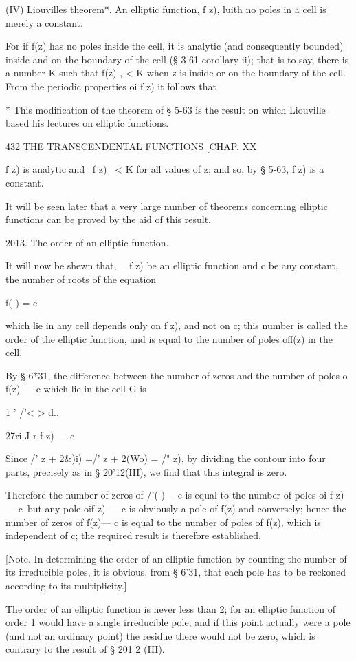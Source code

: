 (IV) Liouvilles theorem*. An elliptic function, f z), luith no poles
in a cell is merely a constant.

For if f(z) has no poles inside the cell, it is analytic (and
consequently bounded) inside and on the boundary of the cell (§ 3-61
corollary ii); that is to say, there is a number K such that f(z) , <
K when z is inside or on the boundary of the cell. From the periodic
properties oi f z) it follows that

* This modification of the theorem of § 5-63 is the result on which
Liouville based his lectures on elliptic functions.

432 THE TRANSCENDENTAL FUNCTIONS [CHAP. XX

f z) is analytic and \ f z) \ < K for all values of z; and so, by §
5-63, f z) is a constant.

It will be seen later that a very large number of theorems concerning
elliptic functions can be proved by the aid of this result.

2013. The order of an elliptic function.

It will now be shewn that, \ \ f z) be an elliptic function and c be
any constant, the number of roots of the equation

f( ) = c

which lie in any cell depends only on f z), and not on c; this number
is called the order of the elliptic function, and is equal to the
number of poles off(z) in the cell.

By § 6*31, the difference between the number of zeros and the number
of poles o f(z) — c which lie in the cell G is

1 ' /'< > d..

27ri J r f z) — c

Since /' z + 2\&)i) =/' z + 2(Wo) = /" z), by dividing the contour
into four parts, precisely as in § 20'12(III), we find that this
integral is zero.

Therefore the number of zeros of /'( )— c is equal to the number of
poles oi f z) — c\ but any pole oif z) — c is obviously a pole of f(z)
and conversely; hence the number of zeros of f(z)— c is equal to the
number of poles of f(z), which is independent of c; the required
result is therefore established.

[Note. In determining the order of an elliptic function by counting
the number of its irreducible poles, it is obvious, from § 6'31, that
each pole has to be reckoned according to its multiplicity.]

The order of an elliptic function is never less than 2; for an
elliptic function of order 1 would have a single irreducible pole;
and if this point actually were a pole (and not an ordinary point) the
residue there would not be zero, which is contrary to the result of §
201 2 (III).

